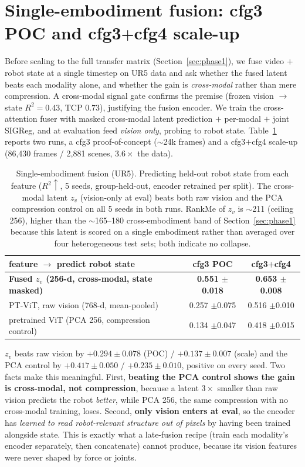 \documentclass{article}
\begin{document}
\section{Single-embodiment fusion: cfg3 POC and cfg3\texorpdfstring{$+$}{+}cfg4 scale-up}
\label{sec:stage2}
Before scaling to the full transfer matrix (Section~\ref{sec:phase1}), we fuse video $+$ robot state at a single timestep on UR5 data and ask whether the fused latent beats each modality alone, and whether the gain is \emph{cross-modal} rather than mere compression. A cross-modal signal gate confirms the premise (frozen vision $\rightarrow$ state $R^2=0.43$, TCP $0.73$), justifying the fusion encoder. We train the cross-attention fuser with masked cross-modal latent prediction $+$ per-modal $+$ joint SIGReg, and at evaluation feed \emph{vision only}, probing to robot state. Table~\ref{tab:stage2} reports two runs, a cfg3 proof-of-concept ($\sim$24k frames) and a cfg3$+$cfg4 scale-up (86{,}430 frames / 2{,}881 scenes, $3.6\times$ the data).

\begin{table}[!htbp]
  \centering
  \caption{Single-embodiment fusion (UR5). Predicting held-out robot state from
  each feature ($R^2\uparrow$, 5 seeds, group-held-out, encoder retrained per split). The cross-modal latent $z_v$ (vision-only at eval) beats both raw vision and the PCA compression control on all 5 seeds in both runs. RankMe of $z_v$ is $\sim$211 (ceiling 256), higher than the $\sim$165--180 cross-embodiment band of Section~\ref{sec:phase1} because this latent is scored on a single embodiment rather than averaged over four heterogeneous test sets; both indicate no collapse.}
  \label{tab:stage2}
  \begin{tabular}{lcc}
    \toprule
    feature $\rightarrow$ predict robot state & cfg3 POC & cfg3$+$cfg4 \\
    \midrule
    \textbf{Fused $z_v$ (256-d, cross-modal, state masked)} & \textbf{0.551 $\pm$0.018} & \textbf{0.653 $\pm$0.008} \\
    PT-ViT, raw vision (768-d, mean-pooled)                     & 0.257 $\pm$0.075          & 0.516 $\pm$0.010 \\
    pretrained ViT (PCA 256, compression control)              & 0.134 $\pm$0.047          & 0.418 $\pm$0.015 \\
    \bottomrule
  \end{tabular}
\end{table}

$z_v$ beats raw vision by $+0.294\pm0.078$ (POC) / $+0.137\pm0.007$ (scale) and the PCA control by $+0.417\pm0.050$ / $+0.235\pm0.010$, positive on every seed. Two facts make this meaningful. First, \textbf{beating the PCA control shows the gain is cross-modal, not compression}, because a latent $3\times$ smaller than raw vision predicts the robot \emph{better}, while PCA 256, the same compression with no cross-modal training, loses. Second, \textbf{only vision enters at eval}, so the encoder has \emph{learned to read robot-relevant structure out of pixels} by having been trained alongside state. This is exactly what a late-fusion recipe (train each modality's encoder separately, then concatenate) cannot produce, because its vision features were never shaped by force or joints.
\end{document}

